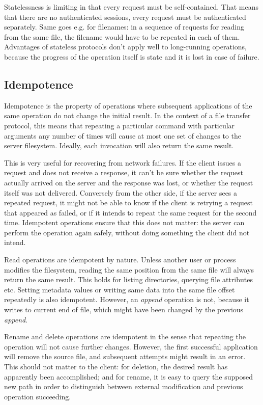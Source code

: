 Statelessness is limiting in that every request must be self-contained. That means that there are no
authenticated sessions, every request must be authenticated separately. Same goes e.g. for filenames: in
a sequence of requests for reading from the same file, the filename would have to be repeated in each of them.
Advantages of stateless protocols don't apply well to long-running operations, because the progress of the
operation itself is state and it is lost in case of failure.

\subsection{Idempotence}

Idempotence is the property of operations where subsequent applications of the same operation do not change
the initial result. In the context of a file transfer protocol, this means that repeating a particular command
with particular arguments any number of times will cause at most one set of changes to the server filesystem.
Ideally, each invocation will also return the same result.

This is very useful for recovering from network failures. If the client issues a request and does not receive
a response, it can't be sure whether the request actually arrived on the server and the response was lost, or
whether the request itself was not delivered. Conversely from the other side, if the server sees a repeated
request, it might not be able to know if the client is retrying a request that appeared as failed, or if it
intends to repeat the same request for the second time. Idempotent operations ensure that this does not
matter: the server can perform the operation again safely, without doing something the client did not intend.

Read operations are idempotent by nature. Unless another user or process modifies the filesystem, reading the
same position from the same file will always return the same result.  This holds for listing directories,
querying file attributes etc. Setting metadata values or writing same data into the same file offset
repeatedly is also idempotent. However, an {\it append} operation is not, because it writes to current end of
file, which might have been changed by the previous {\it append}.

Rename and delete operations are idempotent in the sense that repeating the operation will not cause further
changes. However, the first successful application will remove the source file, and subsequent attempts might
result in an error. This should not matter to the client: for deletion, the desired result has apparently been
accomplished; and for rename, it is easy to query the supposed new path in order to distinguish between
external modification and previous operation succeeding.

